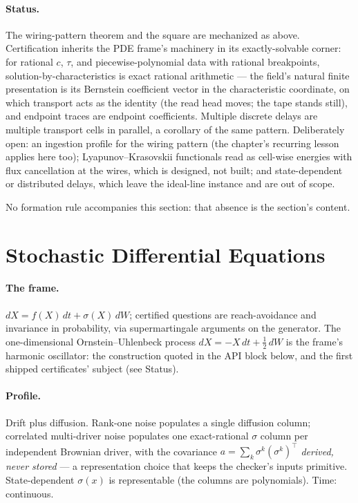 \paragraph{Status.} The wiring-pattern theorem and the square are
mechanized as above.  Certification inherits the PDE frame's
machinery in its exactly-solvable corner: for rational $c$, $\tau$,
and piecewise-polynomial data with rational breakpoints,
solution-by-characteristics is exact rational arithmetic --- the
field's natural finite presentation is its Bernstein coefficient
vector in the characteristic coordinate, on which transport acts as
the identity (the read head moves; the tape stands still), and
endpoint traces are endpoint coefficients.  Multiple discrete delays
are multiple transport cells in parallel, a corollary of the same
pattern.  Deliberately open: an ingestion profile for the wiring
pattern (the chapter's recurring lesson applies here too);
Lyapunov--Krasovskii functionals read as cell-wise energies with
flux cancellation at the wires, which is designed, not built; and
state-dependent or distributed delays, which leave the ideal-line
instance and are out of scope.

No formation rule accompanies this section: that absence is the
section's content.

\section{Stochastic Differential Equations}
\label{sec:mt-sde}

\paragraph{The frame.} $dX = f(X)\,dt + \sigma(X)\,dW$; certified
questions are reach-avoidance and invariance in probability, via
supermartingale arguments on the generator. The one-dimensional
Ornstein--Uhlenbeck process $dX = -X\,dt + \tfrac{1}{2}\,dW$ is the
frame's harmonic oscillator: the construction quoted in the API
block below, and the first shipped certificates' subject (see
Status).

\paragraph{Profile.} Drift plus diffusion. Rank-one noise populates a
single diffusion column; correlated multi-driver noise populates one
exact-rational $\sigma$ column per independent Brownian driver, with
the covariance $a = \sum_k \sigma^k (\sigma^k)^{\!\top}$
\emph{derived, never stored} --- a representation choice that keeps
the checker's inputs primitive. State-dependent $\sigma(x)$ is
representable (the columns are polynomials). Time: continuous.

